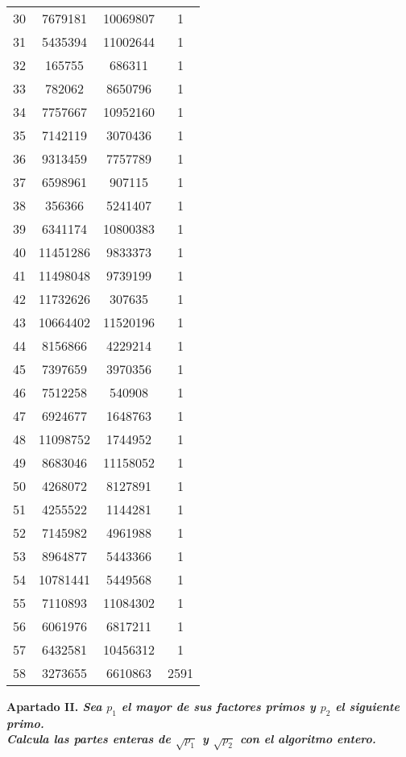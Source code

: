 \documentclass[fleqn]{article}
\begin{document}
\begin{center}
\begin{tabular}{| c | c | c | c |}
            30 & 7679181 & 10069807 & 1 \\
            31 & 5435394 & 11002644 & 1 \\
            32 & 165755 & 686311 & 1 \\
            33 & 782062 & 8650796 & 1 \\
            34 & 7757667 & 10952160 & 1 \\
            35 & 7142119 & 3070436 & 1 \\
            36 & 9313459 & 7757789 & 1 \\
            37 & 6598961 & 907115 & 1 \\
            38 & 356366 & 5241407 & 1 \\
            39 & 6341174 & 10800383 & 1 \\
            40 & 11451286 & 9833373 & 1 \\
            41 & 11498048 & 9739199 & 1 \\
            42 & 11732626 & 307635 & 1 \\
            43 & 10664402 & 11520196 & 1 \\
            44 & 8156866 & 4229214 & 1 \\
            45 & 7397659 & 3970356 & 1 \\
            46 & 7512258 & 540908 & 1 \\
            47 & 6924677 & 1648763 & 1 \\
            48 & 11098752 & 1744952 & 1 \\
            49 & 8683046 & 11158052 & 1 \\
            50 & 4268072 & 8127891 & 1 \\
            51 & 4255522 & 1144281 & 1 \\
            52 & 7145982 & 4961988 & 1 \\
            53 & 8964877 & 5443366 & 1 \\
            54 & 10781441 & 5449568 & 1 \\
            55 & 7110893 & 11084302 & 1 \\
            56 & 6061976 & 6817211 & 1 \\
            57 & 6432581 & 10456312 & 1 \\
            58 & 3273655 & 6610863 & 2591 \\ \hline
        \end{tabular}
    \end{center}

    \newpage
    \textbf{Apartado II. \textit{Sea $p_1$ el mayor de sus factores primos y $p_2$ el siguiente primo.\\ 
    Calcula las partes enteras de $\sqrt{p_1}$ y $\sqrt{p_2}$ con el algoritmo entero.}}
\end{document}
